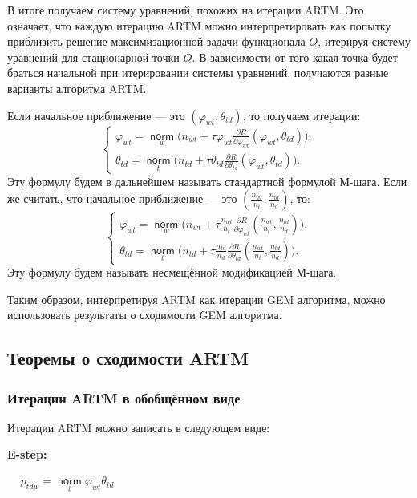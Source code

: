 \documentclass[12pt]{article}
\renewcommand{\phi}{\varphi}
\newcommand{\norm}{\mathop{\mathsf{norm}}\limits}
\begin{document}
В итоге получаем систему уравнений, похожих на итерации ARTM. Это означает, что каждую итерацию ARTM можно интерпретировать как попытку приблизить решение максимизационной задачи функционала $Q$, итерируя систему уравнений для стационарной точки $Q$. В зависимости от того какая точка будет браться начальной при итерировании системы уравнений, получаются разные варианты алгоритма ARTM.

Если начальное приближение --- это $(\phi_{wt}, \theta_{td})$, то получаем итерации:
\[
\left\{
	\begin{aligned}
		\phi_{wt} = \norm_w \bigg( n_{wt} + \tau\phi_{wt} \frac{\partial{R}}{\partial{\phi_{wt}}} \left( \phi_{wt}, \theta_{td}\right) \bigg),\\
		\theta_{td} = \norm_t \bigg( n_{td} + \tau\theta_{td} \frac{\partial{R}}{\partial{\theta_{td}}} \left( \phi_{wt}, \theta_{td}\right) \bigg).
	\end{aligned}
\right.
\]
Эту формулу будем в дальнейшем называть стандартной формулой М-шага. Если же считать, что начальное приближение ---  это $\left(\frac{n_{wt}}{n_t}, \frac{n_{td}}{n_d}\right)$, то:
\[
\left\{
	\begin{aligned}
		\phi_{wt}= \norm_w \bigg( n_{wt} + \tau \frac{n_{wt}}{n_t} \frac{\partial{R}}{\partial{\phi_{wt}}} \left(\frac{n_{wt}}{n_t}, \frac{n_{td}}{n_d}\right) \bigg),\\
		\theta_{td} = \norm_t \bigg(n_{td} + \tau \frac{n_{td}}{n_d} \frac{\partial{R}}{\partial{\theta_{td}}} \left(\frac{n_{wt}}{n_t}, \frac{n_{td}}{n_d}\right) \bigg).
	\end{aligned}
\right.
\]
Эту формулу будем называть несмещённой модификацией М-шага.

 Таким образом, интерпретируя ARTM как итерации GEM алгоритма, можно использовать результаты о сходимости GEM алгоритма.
	\subsection{Теоремы о сходимости ARTM }
	\subsubsection{Итерации ARTM в обобщённом виде}	  
Итерации ARTM можно записать в следующем виде: 

\textbf{E-step:}   
 
$
\begin{aligned}
& p_{tdw} = \norm_t \phi_{wt} \theta_{td}
\end{aligned}
$\medskip
\end{document}
